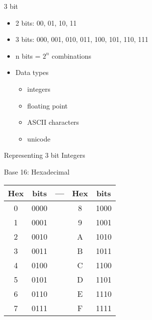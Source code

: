 \begin{withoutheadline}
\begin{frame}{3 bit}
\begin{itemize}
    \item 2 bits: 00, 01, 10, 11
    \item 3 bits: 000, 001, 010, 011, 100, 101, 110, 111
    \item n bits = $2^n$ combinations
    \item Data types
    \begin{itemize}
        \item integers
        \item floating point
        \item ASCII characters
        \item unicode
    \end{itemize}
\end{itemize}
\end{frame}

\begin{frame}[fragile]{Representing 3 bit Integers}
\end{frame}

\begin{frame}[fragile]{Base 16: Hexadecimal}
\begin{tabular}{c|c|c|c|c}
    \hline
    Hex & bits & --- & Hex & bits  \\ \hline
    0 & 0000 & & 8 & 1000 \\
    1 & 0001 & & 9 & 1001 \\
    2 & 0010 & & A & 1010 \\
    3 & 0011 & & B & 1011 \\
    4 & 0100 & & C & 1100 \\
    5 & 0101 & & D & 1101 \\
    6 & 0110 & & E & 1110 \\
    7 & 0111 & & F & 1111 \\    \hline
\end{tabular}
\end{frame}


\end{withoutheadline}
